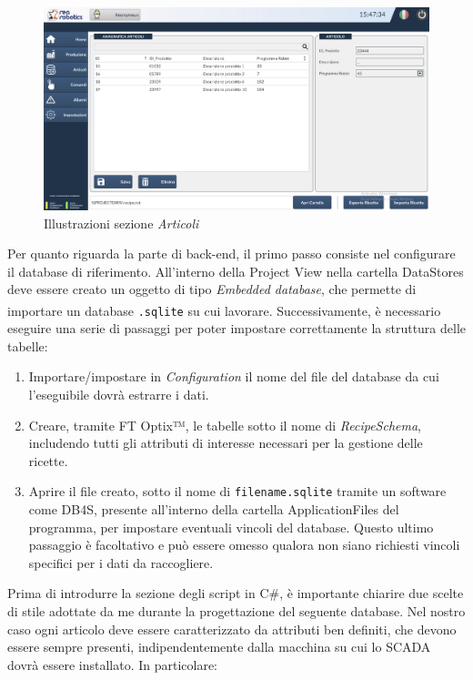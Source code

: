 \begin{figure} 
    \centering
    \includegraphics[width=1\linewidth]{Immagini/AnagraficaArticoli.png}
    \caption{Illustrazioni sezione \textit{Articoli}}
    \label{fig:AnagraficaArticoli.png}
\end{figure}

Per quanto riguarda la parte di back-end, il primo passo consiste nel configurare il database di riferimento. All'interno della Project View nella cartella DataStores deve essere creato un oggetto di tipo \textit{Embedded database}, che permette di importare un database \verb|.sqlite| su cui lavorare\textsuperscript{\cite{rockwelloptixdatastore}}. Successivamente, è necessario eseguire una serie di passaggi per poter impostare correttamente la struttura delle tabelle:

\begin{enumerate}
    \item Importare/impostare in \textit{Configuration} il nome del file del database da cui l'eseguibile dovrà estrarre i dati.
    \item Creare, tramite FT Optix™, le tabelle sotto il nome di \textit{RecipeSchema}, includendo tutti gli attributi di interesse necessari per la gestione delle ricette.
    \item Aprire il file creato, sotto il nome di \verb|filename.sqlite| tramite un software come DB4S, presente all'interno della cartella ApplicationFiles del programma, per impostare eventuali vincoli del database. Questo ultimo passaggio è facoltativo e può essere omesso qualora non siano richiesti vincoli specifici per i dati da raccogliere.
\end{enumerate} 

Prima di introdurre la sezione degli script in C\#, è importante chiarire due scelte di stile adottate da me durante la progettazione del seguente database. Nel nostro caso ogni articolo deve essere caratterizzato da attributi ben definiti, che devono essere sempre presenti, indipendentemente dalla macchina su cui lo SCADA dovrà essere installato. In particolare:

